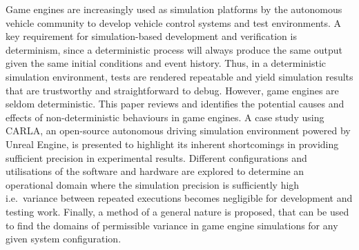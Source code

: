 Game engines are increasingly used as simulation platforms by the autonomous vehicle community to develop vehicle control systems and test environments. A key requirement for simulation-based development and verification is determinism, since a deterministic process will always produce the same output given the same initial conditions and event history. Thus, in a deterministic simulation environment, tests are rendered repeatable and yield simulation results that are trustworthy and straightforward to debug. However, game engines are seldom deterministic. This paper reviews and identifies the potential causes and effects of non-deterministic behaviours in game engines. A case study using CARLA, an open-source autonomous driving simulation environment powered by Unreal Engine, is presented to highlight its inherent shortcomings in providing sufficient precision in experimental results. Different configurations and utilisations of the software and hardware are explored to determine an operational domain where the simulation precision is sufficiently high i.e.\ variance between repeated executions becomes negligible for development and testing work. Finally, a method of a general nature is proposed, that can be used to find the domains of permissible variance in game engine simulations for any given system configuration.
